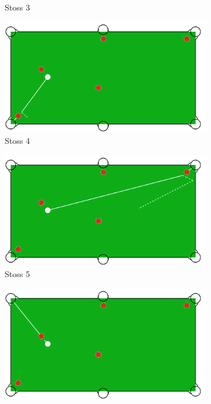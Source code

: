 \begin{figure}[h!]
\begin{subfigure}[b]{0.3\textwidth}
        \caption{Stoss 3}
        \label{fig:situation_velocity_1_solution_3}
    \end{subfigure}
    \hfill
    \begin{subfigure}[b]{0.3\textwidth}
        \centering
        \includegraphics[width=1.0\linewidth]{../common/04_results/resources/simple_search/situation_diverse_solution_velocity_4.PNG}
        \caption{Stoss 4}
        \label{fig:situation_velocity_1_solution_4}
    \end{subfigure}
    \hfill
    \begin{subfigure}[b]{0.3\textwidth}
        \centering
        \includegraphics[width=1.0\linewidth]{../common/04_results/resources/simple_search/situation_diverse_solution_velocity_5.PNG}
        \caption{Stoss 5}
        \label{fig:situation_velocity_1_solution_5}
    \end{subfigure}
    \hfill
    \begin{subfigure}[b]{0.3\textwidth}
        \centering
        \includegraphics[width=1.0\linewidth]{../common/04_results/resources/simple_search/situation_diverse_solution_velocity_6.PNG}

\end{subfigure}
\end{figure}
